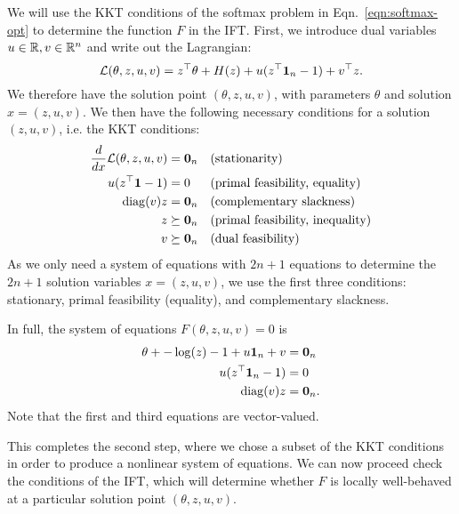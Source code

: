 \documentclass[11pt]{article}
\begin{document}
We will use the KKT conditions of the softmax problem in
Eqn.~\ref{eqn:softmax-opt} to determine the function $F$ in the IFT.
First, we introduce dual variables $u\in\mathbb{R},v\in\mathbb{R}^n$ and write out the Lagrangian:
$$\mathcal{L}(\theta, z, u, v) = z^\top\theta + H(z) + u(z^\top \mathbf{1}_n - 1) + v^\top z.$$
We therefore have the solution point $(\theta,z,u,v)$, with parameters $\theta$
and solution $x=(z,u,v)$.
We then have the following necessary conditions for a solution $(z,u,v)$,
i.e. the KKT conditions:
\begin{equation}
\begin{aligned}
\frac{d}{dx} \mathcal{L}(\theta, z,u,v) &= \mathbf{0}_n && \textrm{(stationarity)}\\
u(z^{\top} \mathbf{1} - 1) &= 0 && \textrm{(primal feasibility, equality)}\\
\mathrm{diag}(v)z &= \mathbf{0}_{n} && \textrm{(complementary slackness)}\\
z &\succeq \mathbf{0}_n && \textrm{(primal feasibility, inequality)}\\
v &\succeq \mathbf{0}_n && \textrm{(dual feasibility)}
\end{aligned}
\end{equation}
As we only need a system of equations with $2n+1$ equations to
determine the $2n+1$ solution variables $x=(z,u,v)$,
we use the first three conditions: stationary, primal feasibility (equality),
and complementary slackness.

In full, the system of equations $F(\theta, z,u,v) = 0$ is
\begin{equation}
\label{eqn:system}
\begin{aligned}
\theta + -\log(z) - 1 + u\mathbf{1}_n + v &= \mathbf{0}_n\\
u(z^{\top} \mathbf{1}_n - 1) &= 0\\
\mathrm{diag}(v)z &= \mathbf{0}_n.
\end{aligned}
\end{equation}
Note that the first and third equations are vector-valued.

This completes the second step, where we chose a subset of the KKT conditions
in order to produce a nonlinear system of equations.
We can now proceed check the conditions of the IFT,
which will determine whether $F$ is locally well-behaved
at a particular solution point $(\theta, z,u,v)$.
\end{document}
